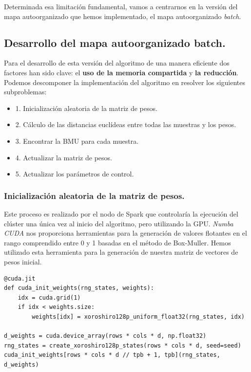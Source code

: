 Determinada esa limitación fundamental, vamos a centrarnos en la versión del mapa autoorganizado que hemos implementado, el mapa autoorganizado \textit{batch}.

\subsection{Desarrollo del mapa autoorganizado batch.}
Para el desarrollo de esta versión del algoritmo de una manera eficiente dos factores han sido clave: el \textbf{uso de la memoria compartida} y \textbf{la reducción}.
Podemos descomponer la implementación del algoritmo en resolver los siguientes subproblemas:

\begin{itemize}
	\item 1. Inicialización aleatoria de la matriz de pesos.
	\item 2. Cálculo de las distancias euclídeas entre todas las muestras y los pesos.
	\item 3. Encontrar la BMU para cada muestra.
	\item 4. Actualizar la matriz de pesos.
	\item 5. Actualizar los parámetros de control.
\end{itemize}

\subsubsection{Inicialización aleatoria de la matriz de pesos.}
Este proceso es realizado por el nodo de Spark que controlaría la ejecución del clúster una única vez al inicio del algoritmo, pero utilizando la GPU. \textit{Numba CUDA} nos proporciona herramientas para la generación de valores flotantes en el rango comprendido entre 0 y 1 basadas en el método de Box-Muller. Hemos utilizado esta herramienta para la generación de nuestra matriz de vectores de pesos inicial.

\begin{code}
\begin{verbatim}
@cuda.jit
def cuda_init_weights(rng_states, weights):
    idx = cuda.grid(1)
    if idx < weights.size:
        weights[idx] = xoroshiro128p_uniform_float32(rng_states, idx)

d_weights = cuda.device_array(rows * cols * d, np.float32)
rng_states = create_xoroshiro128p_states(rows * cols * d, seed=seed)
cuda_init_weights[rows * cols * d // tpb + 1, tpb](rng_states, d_weights)
\end{verbatim}
\label{code:numbainitweights}
\end{code}

